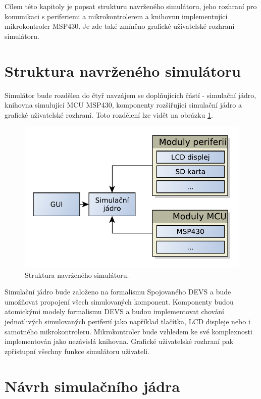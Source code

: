 Cílem této kapitoly je popsat strukturu navrženého simulátoru, jeho rozhraní pro komunikaci s periferiemi a mikrokontrolerem a knihovnu implementující mikrokontroler MSP430. Je zde také zmíněno grafické uživatelské rozhraní simulátoru.

\section{Struktura navrženého simulátoru}

Simulátor bude rozdělen do čtyř navzájem se doplňujících částí - simulační jádro, knihovna simulující MCU MSP430, komponenty rozšiřující simulační jádro a grafické uživatelské rozhraní. Toto rozdělení lze vidět na obrázku \ref{fig:struktura}.

\begin{figure}[ht]
\centering
\includegraphics[trim=0cm 0cm 0cm 0cm, scale=0.7]{fig/struktura}
\caption{Struktura navrženého simulátoru.}
\label{fig:struktura}
\end{figure}

Simulační jádro bude založeno na formalismu Spojovaného DEVS a bude umožňovat propojení všech simulovaných komponent. Komponenty budou atomickými modely formalismu DEVS a budou implementovat chování jednotlivých simulovaných periferií jako například tlačítka, LCD displeje nebo i samotného mikrokontroleru. Mikrokontroler bude vzhledem ke své komplexnosti implementován jako nezávislá knihovna. Grafické uživatelské rozhraní pak zpřístupní všechny funkce simulátoru uživateli.

\section{Návrh simulačního jádra}

